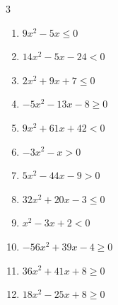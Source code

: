 \begin{multicols}{3}
\begin{enumerate}
  \item $9x^{2}-5x\leq 0$


  \item $14x^{2}-5x-24<0$


  \item $2x^{2}+9x+7\leq 0$


  \item $-5x^{2}-13x-8\geq 0$


\columnbreak %

  \item $9x^{2}+61x+42<0$


  \item $-3x^{2}-x>0$


  \item $5x^{2}-44x-9>0$


  \item $32x^{2}+20x-3\leq 0$


  \item $x^{2}-3x+2<0$

        \phantom{$\displaystyle 1 < x < 2$}

  \item $-56x^{2}+39x-4\geq 0$


  \item $36x^{2}+41x+8\geq 0$


  \item $18x^{2}-25x+8\geq 0$



\end{enumerate}
\end{multicols}
